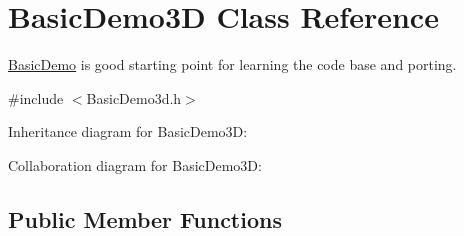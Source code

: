 \hypertarget{class_basic_demo3_d}{\section{Basic\+Demo3\+D Class Reference}
\label{class_basic_demo3_d}
}


\hyperlink{class_basic_demo}{Basic\+Demo} is good starting point for learning the code base and porting.  




{\ttfamily \#include $<$Basic\+Demo3d.\+h$>$}



Inheritance diagram for Basic\+Demo3\+D\+:


Collaboration diagram for Basic\+Demo3\+D\+:
\subsection*{Public Member Functions}
